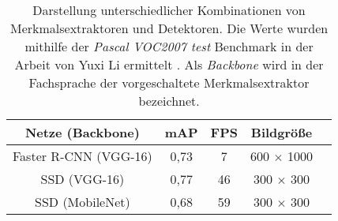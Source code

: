 \begin{table}[H]
	\caption{Darstellung unterschiedlicher Kombinationen von Merkmalsextraktoren und Detektoren. Die Werte wurden mithilfe der \textit{Pascal VOC2007 test} Benchmark in der Arbeit von Yuxi Li ermittelt \cite{leightweight}. Als \textit{Backbone} wird in der Fachsprache der vorgeschaltete Merkmalsextraktor bezeichnet.  }
	\begin{center}
		\begin{tabular}{|c|c|c|c|c|}
			\hline
			\multicolumn{1}{|c|}{Netze (Backbone)} & \multicolumn{1}{c|}{mAP} & \multicolumn{1}{c|}{FPS} & \multicolumn{1}{c|}{Bildgröße} \\ \hline
			Faster R-CNN (VGG-16)	&0,73 	&7 		& 600 $\times$ 1000 	 \\
			SSD (VGG-16)			&0,77 	&46		& 	300 $\times$ 300  	 \\
			SSD (MobileNet)			&0,68	&59		& 300 $\times$ 300 \\
			
			\hline
		\end{tabular}
	\end{center}

	\label{fig: mobilessdtab}
\end{table}